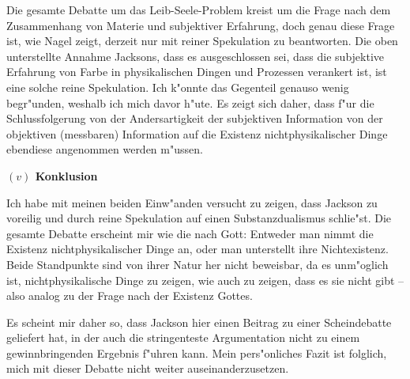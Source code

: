 \documentclass[a4paper, emulatestandardclasses, 12pt]{scrartcl}
\begin{document}
\begin{onehalfspace}
Die gesamte Debatte um das Leib-Seele-Problem kreist um die Frage nach dem Zusammenhang von Materie und subjektiver Erfahrung, doch genau diese Frage ist, wie Nagel zeigt, derzeit nur mit reiner Spekulation zu beantworten. Die oben unterstellte Annahme Jacksons, dass es ausgeschlossen sei, dass die subjektive Erfahrung von Farbe in physikalischen Dingen und Prozessen verankert ist, ist eine solche reine Spekulation. Ich k"onnte das Gegenteil genauso wenig begr"unden, weshalb ich mich davor h"ute. Es zeigt sich daher, dass f"ur die Schlussfolgerung von der Andersartigkeit der subjektiven Information von der objektiven (messbaren) Information auf die Existenz nichtphysikalischer Dinge ebendiese angenommen werden m"ussen. 


\vspace{5mm}
\noindent\textbf{$(v)$ Konklusion}

\noindent Ich habe mit meinen beiden Einw"anden versucht zu zeigen, dass Jackson zu voreilig und durch reine Spekulation auf einen Substanzdualismus schlie"st. Die gesamte Debatte erscheint mir wie die nach Gott: Entweder man nimmt die Existenz nichtphysikalischer Dinge an, oder man unterstellt ihre Nichtexistenz. Beide Standpunkte sind von ihrer Natur her nicht beweisbar, da es unm"oglich ist, nichtphysikalische Dinge zu zeigen, wie auch zu zeigen, dass es sie nicht gibt -- also analog zu der Frage nach der Existenz Gottes. 

Es scheint mir daher so, dass Jackson hier einen Beitrag zu einer Scheindebatte geliefert hat, in der auch die stringenteste Argumentation nicht zu einem gewinnbringenden Ergebnis f"uhren kann. Mein pers"onliches Fazit ist folglich, mich mit dieser Debatte nicht weiter auseinanderzusetzen.




\end{onehalfspace}

\end{document}

